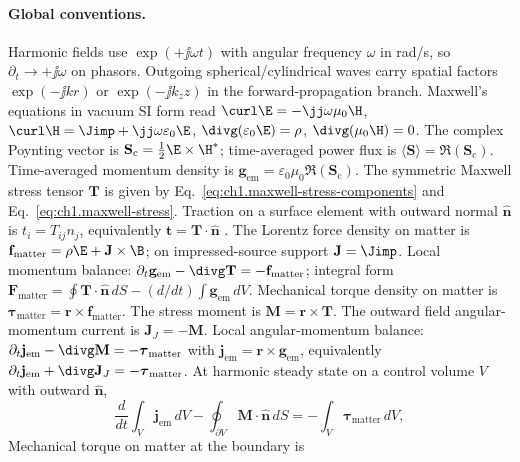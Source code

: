 \paragraph{Global conventions.}
Harmonic fields use $\exp(+\jj\omega t)$ with angular frequency $\omega$ in rad/s, so $\partial_t\rightarrow +\jj\omega$ on phasors.
Outgoing spherical/cylindrical waves carry spatial factors $\exp(-\jj kr)$ or $\exp(-\jj k_z z)$ in the forward-propagation branch.
Maxwell's equations in vacuum SI form read
$\curl\E=-\jj\omega\mu_0\H$,
$\curl\H=\Jimp+\jj\omega\varepsilon_0\E$,
$\divg(\varepsilon_0\E)=\rho$,
$\divg(\mu_0\H)=0$.
The complex Poynting vector is $\mathbf{S}_\mathrm{c}=\tfrac12\E\times\H^*$;
time-averaged power flux is $\langle\mathbf{S}\rangle=\Re(\mathbf{S}_\mathrm{c})$.
Time-averaged momentum density is $\mathbf{g}_{\mathrm{em}}=\varepsilon_0\mu_0\Re(\mathbf{S}_\mathrm{c})$.
The symmetric Maxwell stress tensor $\mathbf{T}$ is given by Eq.~\eqref{eq:ch1.maxwell-stress-components} and Eq.~\eqref{eq:ch1.maxwell-stress}.
Traction on a surface element with outward normal $\hat{\mathbf{n}}$ is $t_i=T_{ij}n_j$, equivalently $\mathbf{t}=\mathbf{T}\cdot\hat{\mathbf{n}}$ \cite{stratton1941}.
The Lorentz force density on matter is $\mathbf{f}_{\mathrm{matter}}=\rho\E+\mathbf{J}\times\B$; on impressed-source support $\mathbf{J}=\Jimp$.
Local momentum balance: $\partial_t\mathbf{g}_{\mathrm{em}}-\divg\mathbf{T}=-\mathbf{f}_{\mathrm{matter}}$;
integral form $\mathbf{F}_{\mathrm{matter}}=\oint \mathbf{T}\cdot\hat{\mathbf{n}}\,dS-(d/dt)\int \mathbf{g}_{\mathrm{em}}\,dV$.
Mechanical torque density on matter is $\boldsymbol{\tau}_{\mathrm{matter}}=\mathbf{r}\times\mathbf{f}_{\mathrm{matter}}$.
The stress moment is $\mathbf{M}=\mathbf{r}\times\mathbf{T}$.
The outward field angular-momentum current is $\mathbf{J}_J=-\mathbf{M}$.
Local angular-momentum balance: $\partial_t\mathbf{j}_{\mathrm{em}}-\divg\mathbf{M}=-\boldsymbol{\tau}_{\mathrm{matter}}$ with $\mathbf{j}_{\mathrm{em}}=\mathbf{r}\times\mathbf{g}_{\mathrm{em}}$, equivalently $\partial_t\mathbf{j}_{\mathrm{em}}+\divg\mathbf{J}_J=-\boldsymbol{\tau}_{\mathrm{matter}}$.
At harmonic steady state on a control volume $V$ with outward $\hat{\mathbf{n}}$,
\begin{equation}
\label{eq:ch1.convention-am-balance}
\frac{d}{dt}\int_V \mathbf{j}_{\mathrm{em}}\,dV
-\oint_{\partial V}\mathbf{M}\cdot\hat{\mathbf{n}}\,dS
=-\int_V \boldsymbol{\tau}_{\mathrm{matter}}\,dV,
\end{equation}
Mechanical torque on matter at the boundary is
